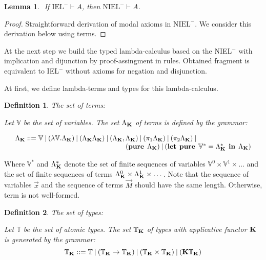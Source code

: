\documentclass[a4paper]{article}
\newtheorem{lemma}{Lemma}
\newtheorem{defin}{Definition}
\begin{document}
\begin{lemma}
  $ $
  If $\text{IEL}^{-} \vdash A$, then $\text{NIEL}^{-} \vdash A$.
\end{lemma}

\begin{proof}
  Straightforward derivation of modal axioms in $\text{NIEL}^{-}$. We consider this derivation below using terms.
\end{proof}

  \vspace{\baselineskip}

  At the next step we build the typed lambda-calculus based on the NIEL$^{-}$ with implication and dijunction
by proof-assingment in rules. Obtained fragment is equivalent to IEL$^{-}$ without axioms for negation and disjunction.

  At first, we define lambda-terms and types for this lambda-calculus.

  \vspace{\baselineskip}

  \begin{defin} The set of terms:

  Let $\mathbb{V}$ be the set of variables. The set $\Lambda_{{\bf K}}$ of terms is defined by the grammar:

$\begin{array}{lll}
& \Lambda_{{\bf K}} ::= \mathbb{V} \: | \:  (\lambda \mathbb{V}.\Lambda_{{\bf K}}) \: | \: (\Lambda_{{\bf K}}\Lambda_{{\bf K}}) \: | \: (\Lambda_{{\bf K}} , \Lambda_{{\bf K}}) \: | \: (\pi_1 \Lambda_{{\bf K}}) \: | \: (\pi_2 \Lambda_{{\bf K}}) \: | & \\
& \quad\quad\quad\quad\quad\quad\quad\quad\quad\quad\quad\quad\quad\quad\quad\quad ({\bf pure \: } \: \Lambda_{{\bf K}}) \: | \: ({\bf let \:\: pure} \:\: \mathbb{V}^{*} = \Lambda_{{\bf K}}^{*} \:\: {\bf in} \:\: \Lambda_{{\bf K}})
\end{array}$

  \end{defin}

Where $\mathbb{V}^{*}$ and $\Lambda_{{\bf K}}^{*}$ denote the set of finite sequences of variables $\mathbb{V}^0 \times \mathbb{V}^1 \times \dots$
and the set of finite sequences of terms $\Lambda_{{\bf K}}^0 \times \Lambda_{{\bf K}}^1 \times \dots$. Note that the sequence of variables $\vec{x}$ and the sequence of terms $\vec{M}$ should have the same length.
Otherwise, term is not well-formed.

  \begin{defin} The set of types:

  Let $\mathbb{T}$ be the set of atomic types. The set $\mathbb{T}_{{\bf K}}$ of types with applicative
  functor ${\bf K}$ is generated by the grammar:
  \begin{equation}
    \mathbb{T}_{{\bf K}} ::= \mathbb{T} \: | \: (\mathbb{T}_{{\bf K}} \to \mathbb{T}_{{\bf K}}) \: |
    \: (\mathbb{T}_{{\bf K}} \times \mathbb{T}_{{\bf K}}) \: | \: ({\bf K}\mathbb{T}_{{\bf K}})
  \end{equation}
  \end{defin}
\end{document}
